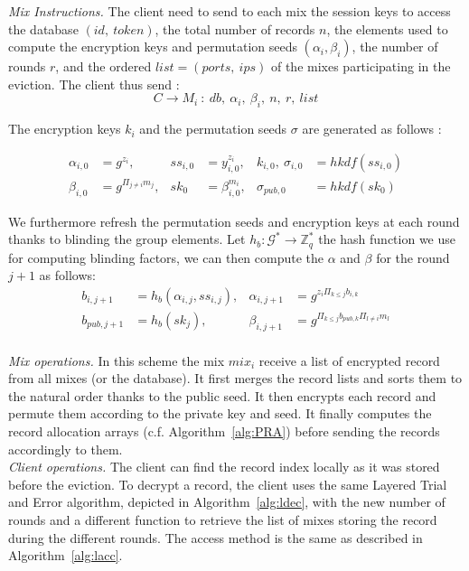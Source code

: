 \documentclass[USenglish,oneside,twocolumn]{article}
\begin{document}
\noindent\textit{Mix Instructions.}
The client need to send to each mix the session keys to access the database $(id,\ token)$, the total number of records $n$, the elements used to compute the encryption keys and permutation seeds $(\alpha_i, \beta_i)$, the number of rounds $r$, and the ordered $list=(ports,\ ips)$ of the mixes participating in the eviction. The client thus send :
$$C \rightarrow M_i\ :\ db,\ \alpha_i,\ \beta_{i},\ n,\ r,\ list$$

The encryption keys $k_i$ and the permutation seeds $\sigma$ are generated as follows :

\vspace{-.5cm}

\begin{align*}
\alpha_{i,0} &= g^{z_i}, &ss_{i,0 }&= y_{i,0}^{z_i}, &k_{i,0},\ \sigma_{i,0}&=hkdf(ss_{i,0})\\
\beta_{i, 0} &= g^{\Pi_{j\neq i}m_j}, &sk_0 &= \beta_{i,0}^{m_i}, &\sigma_{pub, 0}&=hkdf( sk_0)
\end{align*}

We furthermore refresh the permutation seeds and encryption keys at each round thanks to blinding the group elements. Let $h_b : \mathcal{G}^* \rightarrow \mathbb{Z}_{q}^*$ the hash function we use for computing blinding factors, we can then compute the $\alpha$ and $\beta$ for the round $j+1$ as follows:
\begin{align*}
b_{i,j+1}&=h_b(\alpha_{i,j}, ss_{i,j}), & \alpha_{i,j+1} &= g^{z_i\Pi_{k\leq j}b_{i,k}}\\
b_{pub,j+1}&=h_b(sk_{j}), &\beta_{i, j+1} &= g^{\Pi_{k\leq j}b_{pub,k}\Pi_{l\neq i}m_l}\\
\end{align*}

\vspace{-.5cm}

\noindent\textit{Mix operations.} In this scheme the mix $mix_i$ receive a list of encrypted record from all mixes (or the database). It first merges the record lists and  sorts them to the natural order thanks to the public seed. It then encrypts each record and permute them according to the private key and seed. It finally computes the record allocation arrays (c.f. Algorithm~\ref{alg:PRA}) before sending the records accordingly to them.\\

\noindent\textit{Client operations.} The client can find the record index locally as it was stored before the eviction. To decrypt a record, the client uses the same Layered Trial and Error algorithm, depicted in Algorithm~\ref{alg:ldec}, with the new number of rounds and a different function to retrieve the list of mixes storing the record during the different rounds.
The access method is the same as described in Algorithm~\ref{alg:lacc}. \\
\end{document}
